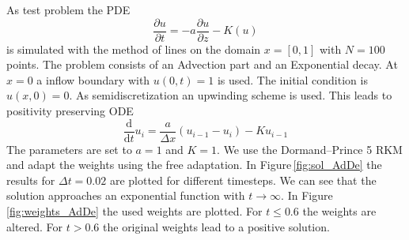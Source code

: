 \documentclass[a4paper]{article}
\numberwithin{equation}{section}
\theoremstyle{plain}
\theoremstyle{definition}
\numberwithin{theorem}{section}
\newcommand{\1}{\mathbbm{1}}
\begin{document}
As test problem the PDE
\begin{equation}
\frac{\partial u}{\partial t} = -a \frac{\partial u}{\partial z} - K (u)
\end{equation}
is simulated with the method of lines on the domain $x = [0,1]$ with $N =100$ points. The problem consists of an Advection part and an Exponential decay. At $x=0$ a inflow boundary with $u(0,t)=1$ is used. The initial condition is $u(x,0)=0$.
As semidiscretization an upwinding scheme is used. This leads to positivity preserving ODE
\begin{equation}
\frac{\mathrm d}{\mathrm d t} u_i = \frac{a}{\Delta x} \left( u_{i-1} - u_i \right) - K u_{i-1}
\end{equation}
The parameters are set to $a=1$ and $K=1$.
We use the Dormand--Prince 5 RKM and adapt the weights using the free adaptation.
In Figure\,\ref{fig:sol_AdDe} the results for $\Delta t = 0.02$ are plotted for different timesteps. We can see that the solution approaches an exponential function with $t \rightarrow \infty$.
In Figure\,\ref{fig:weights_AdDe} the used weights are plotted. For $t\leq 0.6$ the weights are altered. For $t > 0.6$ the original weights lead to a positive solution.
\end{document}
